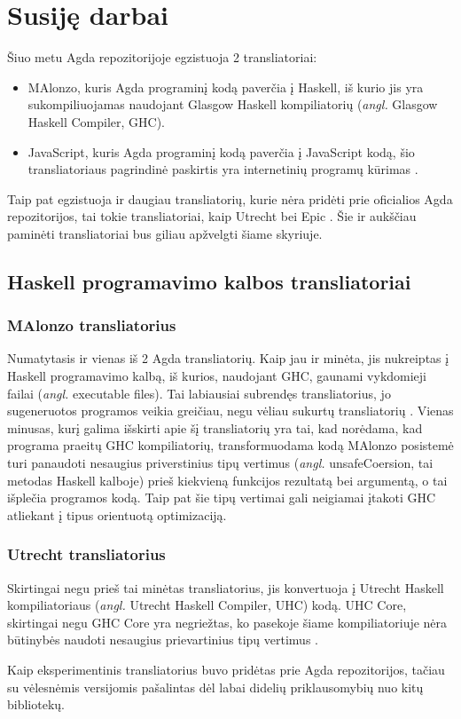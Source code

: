\documentclass{VUMIFPSkursinis}
\begin{document}
\section{Susiję darbai}
Šiuo metu Agda repozitorijoje egzistuoja 2 transliatoriai: 
\begin{itemize}
	\item MAlonzo, kuris Agda programinį kodą paverčia į Haskell, iš kurio jis yra sukompiliuojamas naudojant Glasgow Haskell kompiliatorių (\textit{angl.} Glasgow Haskell Compiler, GHC).
	\item JavaScript, kuris Agda programinį kodą paverčia į JavaScript kodą, šio transliatoriaus pagrindinė paskirtis yra internetinių programų kūrimas \cite{html_agda}.
\end{itemize}
Taip pat egzistuoja ir daugiau transliatorių, kurie nėra pridėti prie oficialios Agda repozitorijos, tai tokie transliatoriai, kaip Utrecht bei Epic \cite{Utrecht,Epic}. Šie ir aukščiau paminėti transliatoriai bus giliau apžvelgti šiame skyriuje.
\subsection{Haskell programavimo kalbos transliatoriai}
\subsubsection{MAlonzo transliatorius}
Numatytasis ir vienas iš 2 Agda transliatorių. Kaip jau ir minėta, jis nukreiptas į Haskell programavimo kalbą, iš kurios, naudojant GHC, gaunami vykdomieji failai (\textit{angl.} executable files). Tai labiausiai subrendęs transliatorius, jo sugeneruotos programos veikia greičiau, negu vėliau sukurtų transliatorių \cite{Utrecht,Epic}. Vienas minusas, kurį galima išskirti apie šį transliatorių yra tai, kad norėdama, kad programa praeitų GHC kompiliatorių, transformuodama kodą MAlonzo posistemė turi panaudoti nesaugius priverstinius tipų vertimus (\textit{angl.} unsafeCoersion, tai metodas Haskell kalboje) prieš kiekvieną funkcijos rezultatą bei argumentą, o tai išplečia programos kodą. Taip pat šie tipų vertimai gali neigiamai įtakoti GHC atliekant į tipus orientuotą optimizaciją.

\subsubsection{Utrecht transliatorius}
Skirtingai negu prieš tai minėtas transliatorius, jis konvertuoja į Utrecht Haskell kompiliatoriaus (\textit{angl.} Utrecht Haskell Compiler, UHC) kodą. UHC Core, skirtingai negu GHC Core yra negriežtas, ko pasekoje šiame kompiliatoriuje nėra būtinybės naudoti nesaugius prievartinius tipų vertimus \cite{Utrecht}.\par Kaip eksperimentinis transliatorius buvo pridėtas prie Agda repozitorijos, tačiau su vėlesnėmis versijomis pašalintas dėl labai didelių priklausomybių nuo kitų bibliotekų.
\end{document}
